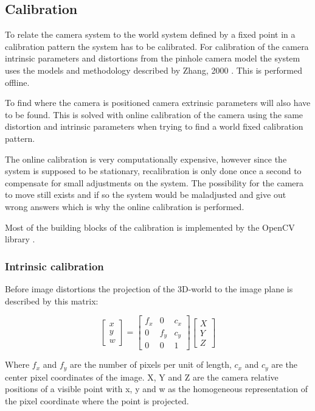 
\subsection{Calibration}
To relate the camera system to the world system defined by a fixed point in a calibration pattern the system has to be calibrated. For calibration of the camera intrinsic parameters and distortions from the pinhole camera model the system uses the models and methodology described by Zhang, 2000 \cite{zhang}. This is performed offline.

To find where the camera is positioned camera extrinsic parameters will also have to be found. This is solved with online calibration of the camera using the same distortion and intrinsic parameters when trying to find a world fixed calibration pattern.

The online calibration is very computationally expensive, however since the system is supposed to be stationary, recalibration is only done once a second to compensate for small adjustments on the system. The possibility for the camera to move still exists and if so the system would be maladjusted and give out wrong answers which is why the online calibration is performed.

Most of the building blocks of the calibration is implemented by the OpenCV library \cite{camcal}. 

\subsubsection{Intrinsic calibration}
Before image distortions the projection of the 3D-world to the image plane is described by this matrix:

\[\begin{bmatrix}
x \\
y \\
w
\end{bmatrix}
=
\begin{bmatrix}
 f_x & 0   & c_x \\ 
 0   & f_y & c_y \\ 
 0   & 0   & 1
\end{bmatrix}
\begin{bmatrix}
X \\
Y \\
Z
\end{bmatrix}\] 

Where $f_x$ and $f_y$ are the number of pixels per unit of length, $c_x$ and $c_y$ are the center pixel coordinates of the image. X, Y and Z are the camera relative positions of a visible point with x, y and w as the homogeneous representation of the pixel coordinate where the point is projected.

